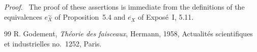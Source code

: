 \documentclass[11pt]{article}
\newenvironment{prooftext}{\par\noindent\emph{Proof.}\ }{\par\medskip}
\begin{document}
\begin{prooftext}
The proof of these assertions is immediate from the definitions of the equivalences \(e_X^{\sim}\) of Proposition~5.4 and \(e_X^{\widehat{\ }}\) of Expos\'e~I, 5.11.
\end{prooftext}

\begin{thebibliography}{99}
 R. Godement, \emph{Th\'eorie des faisceaux}, Hermann, 1958, Actualit\'es scientifiques et industrielles no.~1252, Paris.
\end{thebibliography}
\end{document}
